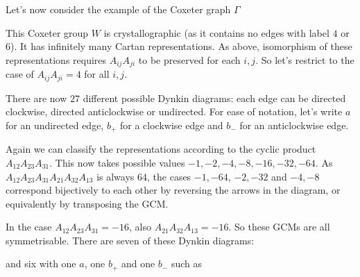 \documentclass[11pt,a4paper]{report}
\theoremstyle{definition}
\begin{document}
Let's now consider the example of the Coxeter graph $\Gamma$

\begin{figure}[h]
\centering
{}
\end{figure}

This Coxeter group $W$ is crystallographic (as it contains no edges with label $4$ or $6$). It has infinitely many Cartan representations. As above, isomorphism of these representations requires $A_{ij} A_{ji}$ to be preserved for each $i, j$. So let's restrict to the case of $A_{ij} A_{ji} = 4$ for all $i, j$. 

There are now $27$ different possible Dynkin diagrams: each edge can be directed clockwise, directed anticlockwise or undirected. For ease of notation, let's write $a$ for an undirected edge, $b_+$ for a clockwise edge and $b_-$ for an anticlockwise edge. 

Again we can classify the representations according to the cyclic product $A_{12} A_{23} A_{31}$. This now takes possible values $-1,-2,-4,-8,-16,-32, -64$. As $A_{12} A_{23} A_{31} A_{21} A_{32} A_{13}$ is always $64$, the cases $-1, -64$, $-2, -32$ and $-4, -8$ correspond bijectively to each other by reversing the arrows in the diagram, or equivalently by transposing the GCM. 

In the case $A_{12} A_{23} A_{31} = -16$, also $A_{21} A_{32} A_{13} = -16$. So these GCMs are all symmetrisable. There are seven of these Dynkin diagrams: 
\pagebreak
\begin{figure}[h!]
\centering
{}
\end{figure}

and six with one $a$, one $b_+$ and one $b_-$ such as 

\begin{figure}[h!]
\centering
{}
\end{figure}
\end{document}
